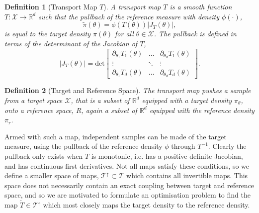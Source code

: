 \documentclass[final]{siamltex}
\newtheorem{dfn}{Definition}[section]
\begin{document}
\begin{dfn}[Transport Map $T$]
	A transport map $T$ is a smooth function $T\colon
        \mathcal{X}\rightarrow\mathbb{R}^d$ such that the {\it
          pullback} of the reference measure with density $\phi(\cdot)$,
	\begin{equation}\label{eq:pullback}
		\tilde{\pi}(\theta) = \phi(T(\theta))|J_T(\theta)|,
	\end{equation}
	is equal to the target density $\pi(\theta)$ for all $\theta \in \mathcal{X}$. The pullback is defined in terms of the determinant of the Jacobian of $T$,
	\[
		|J_T(\theta)| = \text{det}\begin{bmatrix} \partial_{\theta_1} T_1(\theta) & \dots & \partial_{\theta_d} T_1(\theta) \\ \vdots & \ddots & \vdots \\ \partial_{\theta_1} T_d(\theta) & \dots & \partial_{\theta_d} T_d(\theta) \end{bmatrix}.
	\]
\end{dfn}


\begin{dfn}[Target and Reference Space]
	The transport map pushes a sample from a {\it target space} $\mathcal{X}$, that is a subset of $\mathbb{R}^d$ equipped with a target density $\pi_{\theta}$, onto a {\it reference space}, $R$, again a subset of $\mathbb{R}^d$ equipped with the reference density $\pi_r$.
\end{dfn}

Armed with such a map, independent samples can be made of the target
measure, using the pullback of the reference density $\phi$ through $T^{-1}$.
Clearly the pullback only exists when $T$ is monotonic, i.e. has a positive definite Jacobian, and has continuous first derivatives.
Not all maps satisfy these conditions, so we define a smaller space of
maps, $\mathcal{T}^\uparrow \subset \mathcal{T}$ which contains all
invertible maps. This space does not necessarily contain an exact
coupling between target and reference space, and so we are motivated to formulate an optimisation problem to find the map $\tilde{T}
\in \mathcal{T}^\uparrow$ which most closely maps the target density
to the reference density.
\end{document}
